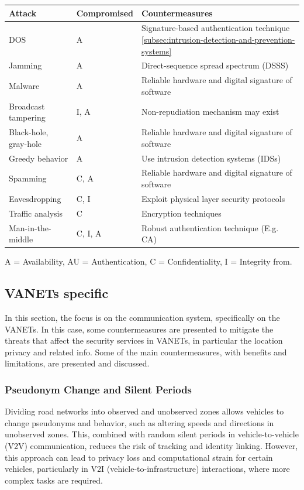\begin{table}[h]
    \centering
    \begin{tabular}{|l|l|l|}
        \hline
        \textbf{Attack} & \textbf{Compromised} & \textbf{Countermeasures} \\ \hline
        DOS & A & Signature-based authentication technique \ref{subsec:intrusion-detection-and-prevention-systems} \\ \hline
        Jamming & A & Direct-sequence spread spectrum (DSSS\cite{wang2022when}) \\ \hline
        Malware & A & Reliable hardware and digital signature of software \\ \hline
        Broadcast tampering & I, A & Non-repudiation mechanism may exist \\ \hline
        Black-hole, gray-hole & A & Reliable hardware and digital signature of software \\ \hline
        Greedy behavior & A & Use intrusion detection systems (IDSs) \\ \hline
        Spamming & C, A & Reliable hardware and digital signature of software \\ \hline
        Eavesdropping & C, I & Exploit physical layer security protocols \\ \hline
        Traffic analysis & C & Encryption techniques \\ \hline
        Man-in-the-middle & C, I, A & Robust authentication technique (E.g. CA) \\ \hline
    \end{tabular}
    \label{tab:Summary of Attacks and Countermeasures}
\end{table}
A = Availability, AU = Authentication, C = Confidentiality, I = Integrity
from\cite{sheikh2019comprehensive}.

\subsection{VANETs specific}\label{subsec:v2x-communication-and-network}

In this section, the focus is on the communication system, specifically on the VANETs.
In this case, some countermeasures are presented to mitigate the threats that affect the security services in VANETs, in particular the location privacy and related info.
Some of the main countermeasures, with benefits and limitations, are presented and discussed.

\subsubsection{Pseudonym Change and Silent Periods}
Dividing road networks into observed and unobserved zones allows vehicles to change pseudonyms and behavior, such as altering speeds and directions in unobserved zones.
This, combined with random silent periods in vehicle-to-vehicle (V2V) communication, reduces the risk of tracking and identity linking.
However, this approach can lead to privacy loss and computational strain for certain vehicles, particularly in V2I (vehicle-to-infrastructure) interactions, where more complex tasks are required.

